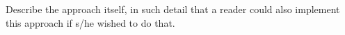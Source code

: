 Describe the approach itself, in such detail that a reader could also implement this approach if s/he wished to do that.